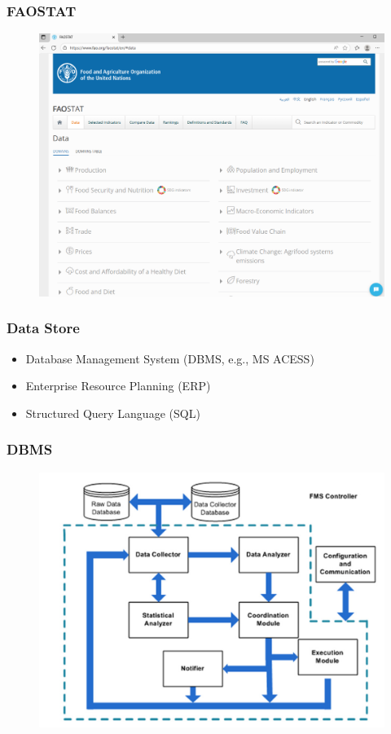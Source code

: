 \documentclass[
	11pt, %
]{beamer}
\begin{document}
\begin{frame}
	\frametitle{FAOSTAT}
	\begin{figure}
		\includegraphics[width=0.8\linewidth]{images/figure8.png}
		\label{fig}
	\end{figure}
\end{frame}

\begin{frame}
	\frametitle{Data Store}
		\begin{itemize}
			\item Database Management System (DBMS, e.g., MS ACESS)
			\item Enterprise Resource Planning (ERP)
			\item Structured Query Language (SQL)
		\end{itemize}
\end{frame}

\begin{frame}
	\frametitle{DBMS}
	\begin{figure}
		\includegraphics[width=0.8\linewidth]{images/figure9.png}
		\label{fig: Kaloxylos et al. 2012}
	\end{figure}
\end{frame}
\end{document}
